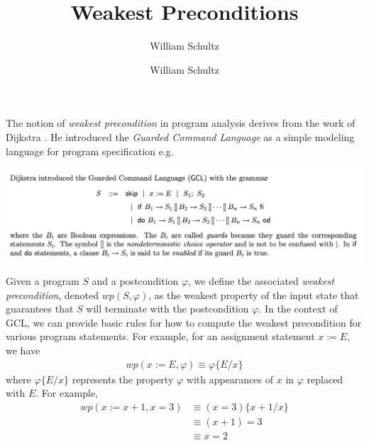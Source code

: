 \documentclass[10pt,a4paper]{article}
\author{William Schultz}
\begin{document}
\title{Weakest Preconditions}
\author{William Schultz}
\maketitle

The notion of \textit{weakest precondition} in program analysis derives from the work of Dijkstra \cite{1975dijkstrawp}. He introduced the \textit{Guarded Command Language} as a simple modeling language for program specification e.g.
\begin{center}
    \includegraphics[scale=0.3]{gcl_grammar.png}
\end{center}
Given a program $S$ and a postcondition $\varphi$, we define the associated \textit{weakest precondition}, denoted $wp(S, \varphi)$, as the weakest property of the input state that guarantees that $S$ will terminate with the postcondition $\varphi$. In the context of GCL, we can provide basic rules for how to compute the weakest precondition for various program statements. For example, for an assignment statement $x := E$, we have
\begin{align*}
    wp(x := E, \varphi) \equiv \varphi\{E/x\}
\end{align*}
where $\varphi\{E/x\}$ represents the property $\varphi$ with appearances of $x$ in $\varphi$ replaced with $E$. For example,
\begin{align*}
    wp(x := x + 1, x = 3) &\equiv (x = 3)\{x+1/x\} \\
    & \equiv (x+1) = 3\\
    & \equiv x = 2\\
\end{align*}
\end{document}
